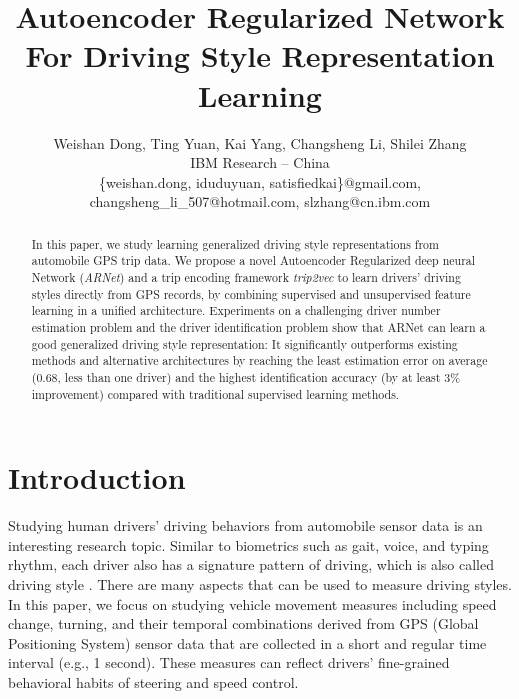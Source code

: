 \documentclass{article}
\title{Autoencoder Regularized Network For Driving Style Representation Learning%
}
\author{Weishan Dong, Ting Yuan, Kai Yang, Changsheng Li, Shilei Zhang\\
IBM Research -- China\\
\normalsize \{weishan.dong, iduduyuan, satisfiedkai\}@gmail.com, 
changsheng\_li\_507@hotmail.com, slzhang@cn.ibm.com}
\begin{document}
\maketitle

\begin{abstract}
In this paper, we study learning generalized driving style representations from automobile GPS trip data. %
We propose a novel Autoencoder Regularized deep neural Network (\emph{ARNet}) and a trip encoding framework \emph{trip2vec} to learn drivers' driving styles directly from GPS records, by combining supervised and unsupervised feature learning in a unified architecture. %
Experiments on a challenging driver number estimation problem and the driver identification problem show that ARNet can learn a good generalized driving style representation: It significantly outperforms existing methods and alternative architectures by reaching the least estimation error on average (0.68, less than one driver) and the highest identification accuracy (by at least 3\% improvement) compared with traditional supervised learning methods.
\end{abstract}

\section{Introduction}
\label{sec:Intro}

Studying human drivers' driving behaviors from automobile sensor data is an interesting research topic.
Similar to biometrics such as gait, voice, and typing rhythm, %
each driver also has a signature pattern of driving, %
which is also called driving style \cite{lin2014overview}.
There are many aspects that can be used to measure driving styles. In this paper, we focus on studying vehicle movement measures including speed change, turning, and their temporal combinations derived from GPS (Global Positioning System) sensor data that are collected in a short and regular time interval (e.g., 1 second). These measures can reflect drivers' fine-grained behavioral habits of steering and speed control. %
\end{document}
